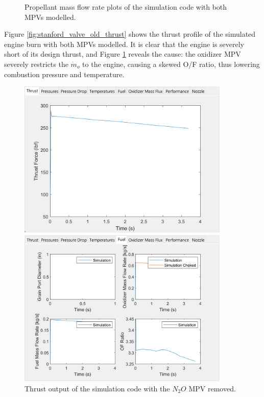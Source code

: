 \documentclass[9pt]{article} %
\numberwithin{equation}{section} %
\begin{document}
\begin{figure}
\begin{minipage}{0.49\textwidth}
        \caption{Propellant mass flow rate plots of the simulation code with both MPVs modelled.}
        \label{fig:stanford_valve_old_fuel}
    \end{minipage}
\end{figure} 

Figure \ref{fig:stanford_valve_old_thrust} shows the thrust profile of the simulated engine burn with both MPVs modelled. It is clear that the engine is severely short of its design thrust, and Figure \ref{fig:stanford_valve_old_fuel} reveals the cause: the oxidizer MPV severely restricts the $\dot{m}_{o}$ to the engine, causing a skewed O/F ratio, thus lowering combustion pressure and temperature. 

\begin{figure}
    \centering
    \begin{minipage}{0.49\textwidth}
        \centering
        \includegraphics[scale=0.5, width=0.9\textwidth, trim={0cm 0cm 0cm 0cm}, clip]{system_sim_files/stanford_novalve_oldmass_thrust.png} %
        \caption{Thrust output of the simulation code with the $N_{2}O$ MPV removed.}
        \label{fig:stanford_novalve_old_thrust}
    \end{minipage}\hfill
    \begin{minipage}{0.49\textwidth}
        \centering
        \includegraphics[scale=0.5, width=0.9\textwidth, trim={0cm 0cm 0cm 0cm}, clip]{system_sim_files/stanford_novalve_oldmass_fuel.png} %

\end{minipage}
\end{figure}
\end{document}
